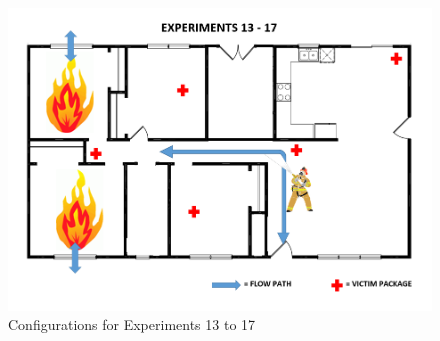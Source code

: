 \documentclass[12pt,oneside]{book}
\begin{document}
\begin{figure}[!ht]
	\centering
	\includegraphics[width=5in]{Figures/General/Exps13through17.png}
	\caption{Configurations for Experiments 13 to 17}
	\label{fig:Two_Vent_int}
\end{figure}
\end{document}
